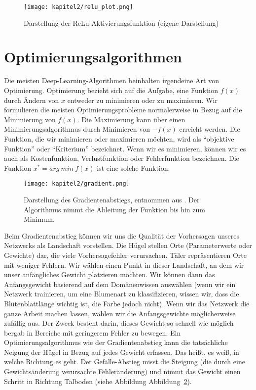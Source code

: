 \begin{figure}[H]
  \centering
  \texttt{[image: kapitel2/relu\_plot.png]}
  \caption[Darstellung der ReLu-Aktivierungsfunktion]{Darstellung der ReLu-Aktivierungsfunktion (eigene Darstellung)}
  \label{Kap2:ReLu_plot}
\end{figure}


\section{Optimierungsalgorithmen}
Die meisten Deep-Learning-Algorithmen beinhalten irgendeine Art von Optimierung. Optimierung bezieht sich auf die Aufgabe, eine Funktion $f(x)$ durch Ändern von $x$ entweder zu minimieren oder zu maximieren. Wir formulieren die meisten Optimierungsprobleme normalerweise in Bezug auf die Minimierung von $f(x)$. Die Maximierung kann über einen Minimierungsalgorithmus durch Minimieren von $-$$f(x)$ erreicht werden. Die Funktion, die wir minimieren oder maximieren möchten, wird als \enquote{objektive Funktion} oder \enquote{Kriterium} bezeichnet. Wenn wir es minimieren, können wir es auch als Kostenfunktion, Verlustfunktion oder Fehlerfunktion bezeichnen. Die Funktion $x^{*} = arg\ min\ f( x)$ ist eine solche Funktion.

    \begin{figure}[H]
      \centering
      \texttt{[image: kapitel2/gradient.png]}
      \caption[Der Gradientenabstieg]{Darstellung des Gradientenabstiegs, entnommen aus \cite*{IanGoodfellowYoshuaBengio2016}. Der Algorithmus nimmt die Ableitung der Funktion bis hin zum Minimum.}
      \label{Kap2:Grad}
    \end{figure}

    Beim Gradientenabstieg können wir uns die Qualität der Vorhersagen unseres Netzwerks als Landschaft vorstellen. Die Hügel stellen Orte (Parameterwerte oder Gewichte) dar, die viele Vorhersagefehler verursachen. Täler repräsentieren Orte mit weniger Fehlern. Wir wählen einen Punkt in dieser Landschaft, an dem wir unser anfängliches Gewicht platzieren möchten. Wir können dann das Anfangsgewicht basierend auf dem Domänenwissen auswählen (wenn wir ein Netzwerk trainieren, um eine Blumenart zu klassifizieren, wissen wir, dass die Blütenblattlänge wichtig ist, die Farbe jedoch nicht). Wenn wir das Netzwerk die ganze Arbeit machen lassen, wählen wir die Anfangsgewichte möglicherweise zufällig aus. Der Zweck besteht darin, dieses Gewicht so schnell wie möglich bergab in Bereiche mit geringerem Fehler zu bewegen. Ein Optimierungsalgorithmus wie der Gradientenabstieg kann die tatsächliche Neigung der Hügel in Bezug auf jedes Gewicht erfassen. Das heißt, es weiß, in welche Richtung es geht. Der Gefälle-Abstieg misst die Steigung (die durch eine Gewichtsänderung verursachte Fehleränderung) und nimmt das Gewicht einen Schritt in Richtung Talboden \cite*[34]{Patterson2019} (siehe Abbildung Abbildung~\ref{Kap2:Grad}).

